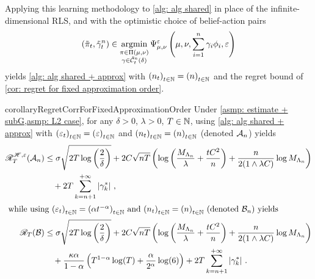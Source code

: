 Applying this learning methodology to \cref{alg: alg shared} in place of the infinite-dimensional RLS, and with the optimistic choice of belief-action pairs
\begin{align}
    (\tilde\pi_t,\tilde \gamma_t^n)\in \operatorname*{argmin}_{\substack{\pi\in\Pi(\mu,\nu)\\ \gamma\in \tilde{\mathcal{C}}_{t}^{n}(\delta)}}\Psi_{\mu,\nu}^\varepsilon\left(\mu,\nu,\sum_{i=1}^n\gamma_{i}\phi_i,\varepsilon\right)\label{eq: optimism for finite order}
\end{align}
yields \cref{alg: alg shared + approx} with ${(n_t)}_{t\in\mathbb{N}}={(n)}_{t\in\mathbb{N}}$ and the regret bound of \cref{cor: regret for fixed approximation order}.

\begin{algorithm}
    \caption{\namealgtwo{}\label{alg: alg shared + approx}}
\end{algorithm}

\begin{restatable}{corollary}{RegretCorrForFixedApproximationOrder}\label{cor: regret for fixed approximation order}
    Under \cref{asmp: estimate + subG,asmp: L2 case}, for any $\delta>0$, $\lambda>0$, $T\in\mathbb{N}$, using \cref{alg: alg shared + approx} with ${(\varepsilon_t)}_{t\in\mathbb{N}}={(\varepsilon)}_{t\in\mathbb{N}}$ and ${(n_t)}_{t\in\mathbb{N}}={(n)}_{t\in\mathbb{N}}$ (denoted $\mathcal{A}_n$) yields
    \begin{align}
        \mathscr{R}_T^{\mathscr{H},\varepsilon} (\mathcal{A}_n)&\le  \sigma\sqrt{2T\log\left(\frac2\delta\right)} + 2C\sqrt{nT}\left(\log\left(\frac{M_{\Lambda_n}}\lambda + \frac{t C^2}n\right)+\frac{n}{2(1\wedge\lambda C)}\log M_{\Lambda_n} \right)\notag\\
        &\quad +2T \sum_{k=n+1}^{+\infty}\left\lvert \gamma_k^* \right\rvert\,, \label{eq: entropic regret for fixed approximation order} \\
        \intertext{ while using ${(\varepsilon_t)}_{t\in\mathbb{N}}={(\alpha t^{-\alpha})}_{t\in\mathbb{N}}$ and ${(n_t)}_{t\in\mathbb{N}}={(n)}_{t\in\mathbb{N}}$ (denoted $\mathcal{B}_n$) yields }
        \mathscr{R}_T(\mathcal{B}) &\le \sigma\sqrt{2T\log\left(\frac2\delta\right)} + 2C\sqrt{nT}\left(\log\left(\frac{M_{\Lambda_n}}\lambda + \frac{t C^2}n\right)+\frac{n}{2(1\wedge\lambda C)}\log M_{\Lambda_n} \right)\notag\\
        &\quad +\frac{\kappa\alpha}{1-\alpha}\left(T^{1-\alpha}\log(T) + \frac{\alpha}{2^\alpha}\log(6)\right) + 2T \sum_{k=n+1}^{+\infty}\left\lvert \gamma_k^* \right\rvert\,.  \label{eq: Kantorovich regret for fixed approximation order}
    \end{align}
\end{restatable}

